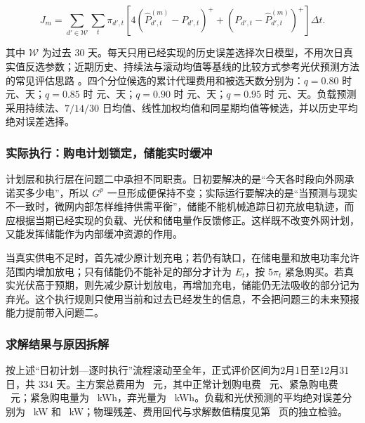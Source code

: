 \begin{equation}
    J_m=\sum_{d'\in\mathcal W}\sum_t\pi_{d',t}\left[
    4(\hat P^{(m)}_{d',t}-P_{d',t})^+
    +(P_{d',t}-\hat P^{(m)}_{d',t})^+\right]\Delta t .
    \label{eq:pv-score}
\end{equation}

其中 $\mathcal W$ 为过去 $30$ 天。每天只用已经实现的历史误差选择次日模型，不用次日真实值反选参数；近期历史、持续法与滚动均值等基线的比较方式参考光伏预测方法的常见评估思路 \cite{markovics2022comparison}。四个分位候选的累计代理费用和被选天数分别为：$q=0.80$ 时 \PvQuantEightyScore 元、\PvQuantEightyDays 天；$q=0.85$ 时 \PvQuantEightyFiveScore 元、\PvQuantEightyFiveDays 天；$q=0.90$ 时 \PvQuantNinetyScore 元、\PvQuantNinetyDays 天；$q=0.95$ 时 \PvQuantNinetyFiveScore 元、\PvQuantNinetyFiveDays 天。负载预测采用持续法、$7/14/30$ 日均值、线性加权均值和同星期均值等候选，并以历史平均绝对误差选择。

\subsubsection{实际执行：购电计划锁定，储能实时缓冲}

计划层和执行层在问题二中承担不同职责。日初要解决的是“今天各时段向外网承诺买多少电”，所以 $G^p$ 一旦形成便保持不变；实际运行要解决的是“当预测与现实不一致时，微网内部怎样维持供需平衡”，储能不能机械追踪日初充放电轨迹，而应根据当期已经实现的负载、光伏和储电量作反馈修正。这样既不改变外网计划，又能发挥储能作为内部缓冲资源的作用。

当真实供电不足时，首先减少原计划充电；若仍有缺口，在储电量和放电功率允许范围内增加放电；只有储能仍不能补足的部分才计为 $E_t$，按 $5\pi_t$ 紧急购买。若真实光伏高于预期，则先减少原计划放电，再增加充电，储能仍无法吸收的部分记为弃光。这个执行规则只使用当前和过去已经发生的信息，不会把问题三的未来预报能力提前带入问题二。

\subsubsection{求解结果与原因拆解}

按上述“日初计划—逐时执行”流程滚动至全年，正式评价区间为2月1日至12月31日，共 $334$ 天。主方案总费用为 \QtwoTotal\ 元，其中正常计划购电费 \QtwoPlan\ 元、紧急购电费 \QtwoEmergencyCost\ 元；紧急购电量为 \QtwoEmergency\ kWh，弃光量为 \QtwoCurtail\ kWh。负载和光伏预测的平均绝对误差分别为 \QtwoMae\ kW 和 \QtwoPvMae\ kW；物理残差、费用回代与求解数值精度见第~\pageref{sec:validation} 页的独立检验。

